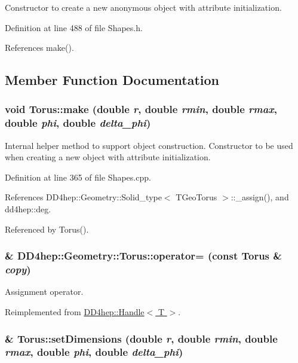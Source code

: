 Constructor to create a new anonymous object with attribute initialization. 

Definition at line 488 of file Shapes.h.

References make().

\subsection{Member Function Documentation}
\hypertarget{class_d_d4hep_1_1_geometry_1_1_torus_afdb3cd4dc6b2095d511330920f0db3fa}{
\subsubsection[{make}]{\setlength{\rightskip}{0pt plus 5cm}void Torus::make (double {\em r}, \/  double {\em rmin}, \/  double {\em rmax}, \/  double {\em phi}, \/  double {\em delta\_\-phi})}}
\label{class_d_d4hep_1_1_geometry_1_1_torus_afdb3cd4dc6b2095d511330920f0db3fa}


Internal helper method to support object construction. Constructor to be used when creating a new object with attribute initialization. 

Definition at line 365 of file Shapes.cpp.

References DD4hep::Geometry::Solid\_\-type$<$ TGeoTorus $>$::\_\-assign(), and dd4hep::deg.

Referenced by Torus().\hypertarget{class_d_d4hep_1_1_geometry_1_1_torus_a755713aeb9d7fc479897742f420ae256}{
\subsubsection[{operator=}]{\& DD4hep::Geometry::Torus::operator= (const {\bf Torus} \& {\em copy})}}
\label{class_d_d4hep_1_1_geometry_1_1_torus_a755713aeb9d7fc479897742f420ae256}


Assignment operator. 

Reimplemented from \hyperlink{class_d_d4hep_1_1_handle_a9bbf8f498df42e81ad26fb00233505a6}{DD4hep::Handle$<$ T $>$}.\hypertarget{class_d_d4hep_1_1_geometry_1_1_torus_a41bf8eb0dae9ebabda620358cad1c648}{
\subsubsection[{setDimensions}]{ \& Torus::setDimensions (double {\em r}, \/  double {\em rmin}, \/  double {\em rmax}, \/  double {\em phi}, \/  double {\em delta\_\-phi})}}
\label{class_d_d4hep_1_1_geometry_1_1_torus_a41bf8eb0dae9ebabda620358cad1c648}


